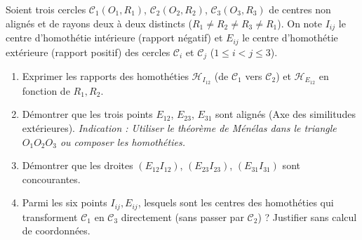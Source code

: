 \documentclass[11pt]{article}
\begin{document}
\begin{exercice}
Soient trois cercles $\mathcal{C}_1(O_1, R_1)$, $\mathcal{C}_2(O_2, R_2)$, $\mathcal{C}_3(O_3, R_3)$ de centres non alignés et de rayons deux à deux distincts ($R_1 \neq R_2 \neq R_3 \neq R_1$).
On note $I_{ij}$ le centre d'homothétie intérieure (rapport négatif) et $E_{ij}$ le centre d'homothétie extérieure (rapport positif) des cercles $\mathcal{C}_i$ et $\mathcal{C}_j$ ($1 \le i < j \le 3$).
\begin{enumerate}
    \item Exprimer les rapports des homothéties $\mathcal{H}_{I_{12}}$ (de $\mathcal{C}_1$ vers $\mathcal{C}_2$) et $\mathcal{H}_{E_{12}}$ en fonction de $R_1, R_2$.
    \item Démontrer que les trois points $E_{12}$, $E_{23}$, $E_{31}$ sont alignés (Axe des similitudes extérieures). \textit{Indication : Utiliser le théorème de Ménélas dans le triangle $O_1O_2O_3$ ou composer les homothéties.}
    \item Démontrer que les droites $(E_{12}I_{12})$, $(E_{23}I_{23})$, $(E_{31}I_{31})$ sont concourantes.
    \item Parmi les six points $I_{ij}, E_{ij}$, lesquels sont les centres des homothéties qui transforment $\mathcal{C}_1$ en $\mathcal{C}_3$ directement (sans passer par $\mathcal{C}_2$) ? Justifier sans calcul de coordonnées.
\end{enumerate}
\end{exercice}
\end{document}
